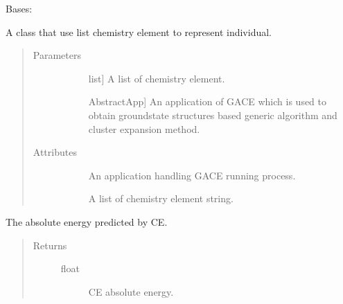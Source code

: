 \documentclass[letterpaper,10pt,english]{sphinxmanual}
\begin{document}
\begin{fulllineitems}
\label{\detokenize{pygace:pygace.utility.EleIndv}}
\sphinxAtStartPar
Bases: 

\sphinxAtStartPar
A class that use list chemistry element to represent individual.
\begin{quote}\begin{description}
\item[{Parameters}] \leavevmode\begin{description}
\item[{}] \leavevmode{[}list{]}
\sphinxAtStartPar
A list of chemistry element.

\item[{}] \leavevmode{[}AbstractApp{]}
\sphinxAtStartPar
An application of GACE which is used to obtain ground\sphinxhyphen{}state
structures based generic algorithm and cluster expansion method.

\end{description}

\item[{Attributes}] \leavevmode\begin{description}
\item[{}] \leavevmode
\sphinxAtStartPar
An application handling GACE running process.

\item[{}] \leavevmode
\sphinxAtStartPar
A list of chemistry element string.

\end{description}

\end{description}\end{quote}

\begin{fulllineitems}
\label{\detokenize{pygace:pygace.utility.EleIndv.ce_energy}}
\sphinxAtStartPar
The absolute energy predicted by CE.
\begin{quote}\begin{description}
\item[{Returns}] \leavevmode\begin{description}
\item[{float}] \leavevmode
\sphinxAtStartPar
CE absolute energy.


\end{description}
\end{description}
\end{quote}
\end{fulllineitems}
\end{fulllineitems}
\end{document}
